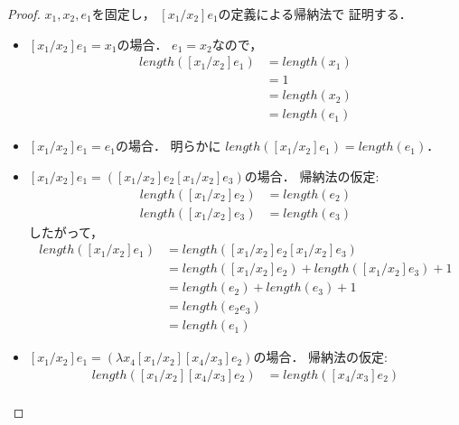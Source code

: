 \documentclass{ltjsbook}%
\begin{document}
\begin{proof}%
  $\mathit{x}_1,\mathit{x}_2,\mathit{e}_1$を固定し，%
  $[\mathit{x}_1/\mathit{x}_2]\mathit{e}_1$の定義による帰納法で%
  証明する．%
  \begin{itemize}%
  \item $[\mathit{x}_1/\mathit{x}_2]\mathit{e}_1 = \mathit{x}_1$の場合．%
    $\mathit{e}_1 = \mathit{x}_2$なので，%
    \begin{align}%
      length([\mathit{x}_1/\mathit{x}_2]\mathit{e}_1)&=length(\mathit{x}_1)\\%
      &=1\\%
      &=length(\mathit{x}_2)\\%
      &=length(\mathit{e}_1)%
    \end{align}%
  \item $[\mathit{x}_1/\mathit{x}_2]\mathit{e}_1 = \mathit{e}_1$の場合．%
    明らかに%
    $length([\mathit{x}_1/\mathit{x}_2]\mathit{e}_1)=length(\mathit{e}_1)$．%
  \item $[\mathit{x}_1/\mathit{x}_2]\mathit{e}_1%
    = ([\mathit{x}_1/\mathit{x}_2]\mathit{e}_2[\mathit{x}_1/\mathit{x}_2]\mathit{e}_3)$の場合．%
    帰納法の仮定:%
    \begin{align}%
    length([\mathit{x}_1/\mathit{x}_2]\mathit{e}_2)&=length(\mathit{e}_2)\\%
    length([\mathit{x}_1/\mathit{x}_2]\mathit{e}_3)&=length(\mathit{e}_3)%
    \end{align}%
    したがって，%
    \begin{align}%
    length([\mathit{x}_1/\mathit{x}_2]\mathit{e}_1)%
    &=length([\mathit{x}_1/\mathit{x}_2]\mathit{e}_2%
    [\mathit{x}_1/\mathit{x}_2]\mathit{e}_3)\\%
    &=length([\mathit{x}_1/\mathit{x}_2]\mathit{e}_2)%
    +length([\mathit{x}_1/\mathit{x}_2]\mathit{e}_3)+1\\%
    &=length(\mathit{e}_2)+length(\mathit{e}_3)+1\\%
    &=length(\mathit{e}_2\mathit{e}_3)\\%
    &=length(\mathit{e}_1)%
    \end{align}%
  \item $[\mathit{x}_1/\mathit{x}_2]\mathit{e}_1%
    = (\lambda\mathit{x}_4[\mathit{x}_1/\mathit{x}_2]%
    [\mathit{x}_4/\mathit{x}_3]\mathit{e}_2)$の場合．%
    帰納法の仮定:%
    \begin{align}%
      length([\mathit{x}_1/\mathit{x}_2][\mathit{x}_4/\mathit{x}_3]\mathit{e}_2)%
      &=length([\mathit{x}_4/\mathit{x}_3]\mathit{e}_2)\\%

\end{align}
\end{itemize}
\end{proof}
\end{document}
